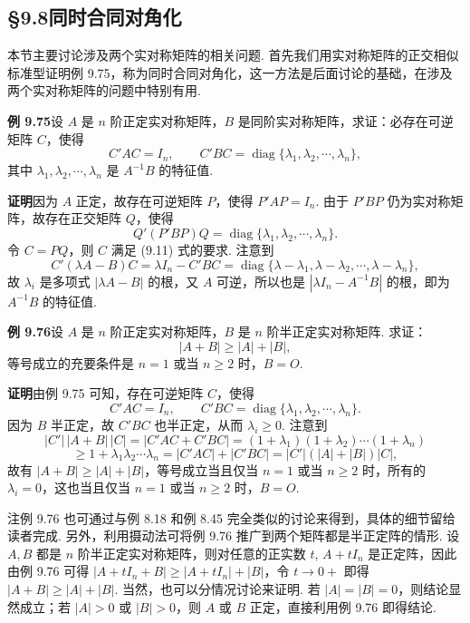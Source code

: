 \documentclass[UTF8, 12pt, fontset=fandol, oneside]{ctexart}
\begin{document}
\subsection*{§9.8\quad 同时合同对角化}

本节主要讨论涉及两个实对称矩阵的相关问题. 首先我们用实对称矩阵的正交相似标准型证明例 9.75，称为同时合同对角化，这一方法是后面讨论的基础，在涉及两个实对称矩阵的问题中特别有用.

\noindent\textbf{例 9.75}\quad 设 $A$ 是 $n$ 阶正定实对称矩阵，$B$ 是同阶实对称矩阵，求证：必存在可逆矩阵 $C$，使得
\begin{equation}
C'AC=I_n,\qquad C'BC=\operatorname{diag}\{\lambda_1,\lambda_2,\cdots,\lambda_n\},
\tag{9.11}
\end{equation}
其中 $\lambda_1,\lambda_2,\cdots,\lambda_n$ 是 $A^{-1}B$ 的特征值.

\noindent\textbf{证明}\quad 因为 $A$ 正定，故存在可逆矩阵 $P$，使得 $P'AP=I_n$. 由于 $P'BP$ 仍为实对称矩阵，故存在正交矩阵 $Q$，使得
\[
Q'(P'BP)Q=\operatorname{diag}\{\lambda_1,\lambda_2,\cdots,\lambda_n\}.
\]
令 $C=PQ$，则 $C$ 满足 (9.11) 式的要求. 注意到
\[
C'(\lambda A-B)C=\lambda I_n-C'BC=\operatorname{diag}\{\lambda-\lambda_1,\lambda-\lambda_2,\cdots,\lambda-\lambda_n\},
\]
故 $\lambda_i$ 是多项式 $|\lambda A-B|$ 的根，又 $A$ 可逆，所以也是 $|\lambda I_n-A^{-1}B|$ 的根，即为 $A^{-1}B$ 的特征值.

\noindent\textbf{例 9.76}\quad 设 $A$ 是 $n$ 阶正定实对称矩阵，$B$ 是 $n$ 阶半正定实对称矩阵. 求证：
\[
|A+B|\ge |A|+|B|,
\]
等号成立的充要条件是 $n=1$ 或当 $n\ge2$ 时，$B=O$.

\noindent\textbf{证明}\quad 由例 9.75 可知，存在可逆矩阵 $C$，使得
\[
C'AC=I_n,\qquad C'BC=\operatorname{diag}\{\lambda_1,\lambda_2,\cdots,\lambda_n\}.
\]
因为 $B$ 半正定，故 $C'BC$ 也半正定，从而 $\lambda_i\ge0$. 注意到
\[
|C'|\,|A+B|\,|C|=|C'AC+C'BC|=(1+\lambda_1)(1+\lambda_2)\cdots(1+\lambda_n)
\]
\[
\ge 1+\lambda_1\lambda_2\cdots\lambda_n=|C'AC|+|C'BC|=|C'|(|A|+|B|)|C|,
\]
故有 $|A+B|\ge|A|+|B|$，等号成立当且仅当 $n=1$ 或当 $n\ge2$ 时，所有的 $\lambda_i=0$，这也当且仅当 $n=1$ 或当 $n\ge2$ 时，$B=O$.

注\quad 例 9.76 也可通过与例 8.18 和例 8.45 完全类似的讨论来得到，具体的细节留给读者完成. 另外，利用摄动法可将例 9.76 推广到两个矩阵都是半正定阵的情形. 设 $A,B$ 都是 $n$ 阶半正定实对称矩阵，则对任意的正实数 $t$, $A+tI_n$ 是正定阵，因此由例 9.76 可得 $|A+tI_n+B|\ge |A+tI_n|+|B|$，令 $t\to0+$ 即得 $|A+B|\ge |A|+|B|$. 当然，也可以分情况讨论来证明. 若 $|A|=|B|=0$，则结论显然成立；若 $|A|>0$ 或 $|B|>0$，则 $A$ 或 $B$ 正定，直接利用例 9.76 即得结论.
\end{document}
